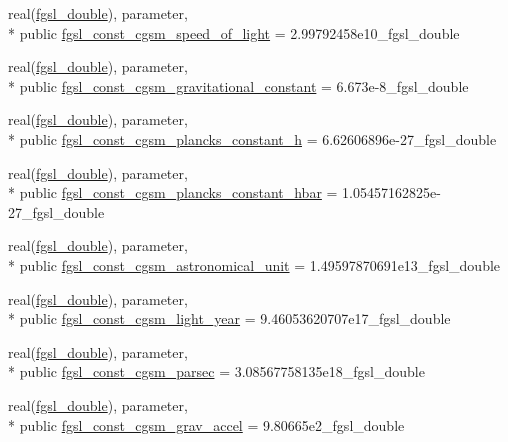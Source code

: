 \begin{DoxyCompactItemize}
\item 
real(\hyperlink{classfgsl_a9af5113378e0f000eb479d3f90196ddf}{fgsl\-\_\-double}), parameter, \\*
public \hyperlink{classfgsl_a5b4812e235747b48af51d2e576dfa469}{fgsl\-\_\-const\-\_\-cgsm\-\_\-speed\-\_\-of\-\_\-light} = 2.\-99792458e10\-\_\-fgsl\-\_\-double
\item 
real(\hyperlink{classfgsl_a9af5113378e0f000eb479d3f90196ddf}{fgsl\-\_\-double}), parameter, \\*
public \hyperlink{classfgsl_a9f255e9dfccd5852a1229344cadc48ba}{fgsl\-\_\-const\-\_\-cgsm\-\_\-gravitational\-\_\-constant} = 6.\-673e-\/8\-\_\-fgsl\-\_\-double
\item 
real(\hyperlink{classfgsl_a9af5113378e0f000eb479d3f90196ddf}{fgsl\-\_\-double}), parameter, \\*
public \hyperlink{classfgsl_ace25c1aaa228a6b88d1f8e8ad1811cc5}{fgsl\-\_\-const\-\_\-cgsm\-\_\-plancks\-\_\-constant\-\_\-h} = 6.\-62606896e-\/27\-\_\-fgsl\-\_\-double
\item 
real(\hyperlink{classfgsl_a9af5113378e0f000eb479d3f90196ddf}{fgsl\-\_\-double}), parameter, \\*
public \hyperlink{classfgsl_a59a3499a4c13d0d58c0aa1470c6c589a}{fgsl\-\_\-const\-\_\-cgsm\-\_\-plancks\-\_\-constant\-\_\-hbar} = 1.\-05457162825e-\/27\-\_\-fgsl\-\_\-double
\item 
real(\hyperlink{classfgsl_a9af5113378e0f000eb479d3f90196ddf}{fgsl\-\_\-double}), parameter, \\*
public \hyperlink{classfgsl_af1dd23df42a3363f75423e5d3ff79cde}{fgsl\-\_\-const\-\_\-cgsm\-\_\-astronomical\-\_\-unit} = 1.\-49597870691e13\-\_\-fgsl\-\_\-double
\item 
real(\hyperlink{classfgsl_a9af5113378e0f000eb479d3f90196ddf}{fgsl\-\_\-double}), parameter, \\*
public \hyperlink{classfgsl_a7a0fc1754861e860249707775c149bd8}{fgsl\-\_\-const\-\_\-cgsm\-\_\-light\-\_\-year} = 9.\-46053620707e17\-\_\-fgsl\-\_\-double
\item 
real(\hyperlink{classfgsl_a9af5113378e0f000eb479d3f90196ddf}{fgsl\-\_\-double}), parameter, \\*
public \hyperlink{classfgsl_a3eb251959ceffa5d3604d70bd5279f02}{fgsl\-\_\-const\-\_\-cgsm\-\_\-parsec} = 3.\-08567758135e18\-\_\-fgsl\-\_\-double
\item 
real(\hyperlink{classfgsl_a9af5113378e0f000eb479d3f90196ddf}{fgsl\-\_\-double}), parameter, \\*
public \hyperlink{classfgsl_abcdb6fe4c8e314d2d05ee14a854357fd}{fgsl\-\_\-const\-\_\-cgsm\-\_\-grav\-\_\-accel} = 9.\-80665e2\-\_\-fgsl\-\_\-double

\end{DoxyCompactItemize}
